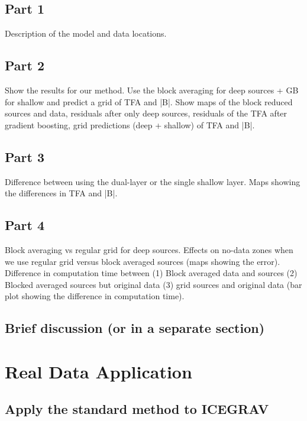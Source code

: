 \subsection{Part 1}
Description of the model and data locations.

\subsection{Part 2}
Show the results for our method. Use the block averaging for deep sources + GB for shallow and predict a grid of TFA and |B|. Show maps of the block reduced sources and data, residuals after only deep sources, residuals of the TFA after gradient boosting, grid predictions (deep + shallow) of TFA and |B|.

\subsection{Part 3}
Difference between using the dual-layer or the single shallow layer. Maps showing the differences in TFA and |B|.

\subsection{Part 4}
Block averaging vs regular grid for deep sources. Effects on no-data zones when we use regular grid versus block averaged sources (maps showing the error). Difference in computation time between (1) Block averaged data and sources (2) Blocked averaged sources but original data (3) grid sources and original data (bar plot showing the difference in computation time).

\subsection{Brief discussion (or in a separate section)}



\section{Real Data Application}

\subsection{Apply the standard method to ICEGRAV}

